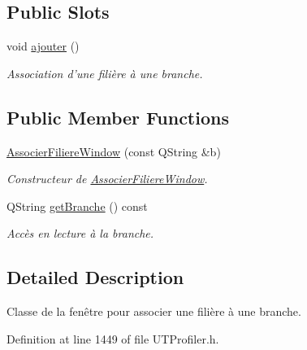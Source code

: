 \subsection*{Public Slots}
\begin{DoxyCompactItemize}
\item 
\hypertarget{class_associer_filiere_window_ae5b2e89b675c54c9a797368d6b4f7b8c}{void \hyperlink{class_associer_filiere_window_ae5b2e89b675c54c9a797368d6b4f7b8c}{ajouter} ()}\label{class_associer_filiere_window_ae5b2e89b675c54c9a797368d6b4f7b8c}

\begin{DoxyCompactList}\small\item\em Association d'une filière à une branche. \end{DoxyCompactList}\end{DoxyCompactItemize}
\subsection*{Public Member Functions}
\begin{DoxyCompactItemize}
\item 
\hyperlink{class_associer_filiere_window_ae970aceb1a4b9fdfbf2e12ff630478a0}{Associer\-Filiere\-Window} (const Q\-String \&b)
\begin{DoxyCompactList}\small\item\em Constructeur de \hyperlink{class_associer_filiere_window}{Associer\-Filiere\-Window}. \end{DoxyCompactList}\item 
Q\-String \hyperlink{class_associer_filiere_window_aeb96bfea5e2dcc59cc49b47196a2298f}{get\-Branche} () const 
\begin{DoxyCompactList}\small\item\em Accès en lecture à la branche. \end{DoxyCompactList}\end{DoxyCompactItemize}


\subsection{Detailed Description}
Classe de la fenêtre pour associer une filière à une branche. 

Definition at line 1449 of file U\-T\-Profiler.\-h.



